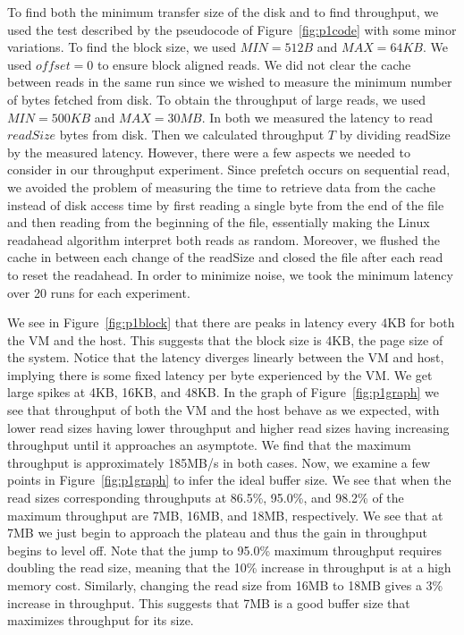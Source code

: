 To find both the minimum transfer size of the disk and to find throughput, we used 
the test described by the pseudocode of Figure~\ref{fig:p1code} with some minor 
variations. To find the block size, we used $MIN = 512B$ and $MAX = 64KB$. 
We used $offset=0$ to ensure block aligned reads. We did not clear the cache
between reads in the same run since we wished to measure the minimum number of bytes
fetched from disk. To obtain the throughput of large reads, we used $MIN = 500KB$ and
$MAX = 30MB$. In both we measured the latency to read $readSize$ bytes from disk.
Then we calculated throughput $T$ by dividing readSize by the measured latency. 
However, there were a few aspects we needed to consider in our throughput experiment. 
Since prefetch occurs on sequential read, we avoided the problem of measuring the 
time to retrieve data from the cache instead of disk access time by first reading 
a single byte from the end of the file and then reading from the beginning of the file, 
essentially making the Linux readahead algorithm interpret both reads as random. 
Moreover, we flushed the cache in between each change of the readSize and closed
the file after each read to reset the readahead. In order to minimize noise, we took
the minimum latency over 20 runs for each experiment.

We see in Figure~\ref{fig:p1block} that there are peaks in latency every 4KB for 
both the VM and the host. This suggests that the block size is 4KB, the page size
of the system. Notice that the latency diverges linearly between the VM and host,
implying there is some fixed latency per byte experienced by the VM. We get large
spikes at 4KB, 16KB, and 48KB. In the graph of Figure~\ref{fig:p1graph} we see 
that throughput of both the VM and the host behave as we expected, with lower 
read sizes having lower throughput and higher read sizes
having increasing throughput until it approaches an asymptote. We find that the 
maximum throughput is approximately 185MB/s in both cases. Now, we examine a few
points in Figure~\ref{fig:p1graph} to infer the ideal buffer size. We see that when 
the read sizes corresponding throughputs at 86.5\%, 95.0\%, and 98.2\% of the maximum 
throughput are 7MB, 16MB, and 18MB, respectively. We see that at 7MB we just begin to 
approach the plateau and thus the gain in throughput begins to level off.
Note that the jump to 95.0\% maximum throughput requires doubling the read size, 
meaning that the 10\% increase in throughput is at a high memory cost. Similarly, 
changing the read size from 16MB to 18MB gives a 3\% increase in throughput. This 
suggests that 7MB is a good buffer size that maximizes throughput for its size.



